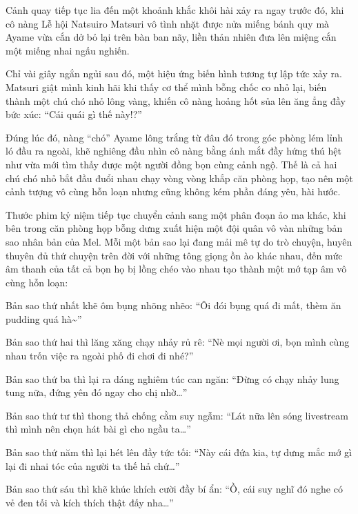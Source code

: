 \documentclass[../main.tex]{subfiles}
\begin{document}

\il

Cảnh quay tiếp tục lia đến một khoảnh khắc khôi hài xảy ra ngay trước đó, khi cô nàng Lễ hội Natsuiro Matsuri vô tình nhặt được nửa miếng bánh quy mà Ayame vừa cắn dở bỏ lại trên bàn ban nãy, liền thản nhiên đưa lên miệng cắn một miếng nhai ngấu nghiến.

Chỉ vài giây ngắn ngủi sau đó, một hiệu ứng biến hình tương tự lập tức xảy ra. Matsuri giật mình kinh hãi khi thấy cơ thể mình bỗng chốc co nhỏ lại, biến thành một chú chó nhỏ lông vàng, khiến cô nàng hoảng hốt sủa lên ăng ẳng đầy bức xúc: ``Cái quái gì thế này!?''

Đúng lúc đó, nàng ``chó'' Ayame lông trắng từ đâu đó trong góc phòng lém lỉnh ló đầu ra ngoài, khẽ nghiêng đầu nhìn cô nàng bằng ánh mắt đầy hứng thú hệt như vừa mới tìm thấy được một người đồng bọn cùng cảnh ngộ. Thế là cả hai chú chó nhỏ bắt đầu đuổi nhau chạy vòng vòng khắp căn phòng họp, tạo nên một cảnh tượng vô cùng hỗn loạn nhưng cũng không kém phần đáng yêu, hài hước.


\il


Thước phim kỷ niệm tiếp tục chuyển cảnh sang một phân đoạn ảo ma khác, khi bên trong căn phòng họp bỗng dưng xuất hiện một đội quân vô vàn những bản sao nhân bản của Mel. Mỗi một bản sao lại đang mải mê tự do trò chuyện, huyên thuyên đủ thứ chuyện trên đời với những tông giọng ồn ào khác nhau, đến mức âm thanh của tất cả bọn họ bị lồng chéo vào nhau tạo thành một mớ tạp âm vô cùng hỗn loạn:

Bản sao thứ nhất khẽ ôm bụng nhõng nhẽo: ``Ôi đói bụng quá đi mất, thèm ăn pudding quá hà\~{}''

Bản sao thứ hai thì lăng xăng chạy nhảy rủ rê: ``Nè mọi người ơi, bọn mình cùng nhau trốn việc ra ngoài phố đi chơi đi nhé?''

Bản sao thứ ba thì lại ra dáng nghiêm túc can ngăn: ``Đừng có chạy nhảy lung tung nữa, đứng yên đó ngay cho chị nhờ\dots''

Bản sao thứ tư thì thong thả chống cằm suy ngẫm: ``Lát nữa lên sóng livestream thì mình nên chọn hát bài gì cho ngầu ta\dots''

Bản sao thứ năm thì lại hét lên đầy tức tối: ``Này cái đứa kia, tự dưng mắc mớ gì lại đi nhai tóc của người ta thế hả chứ\dots''

Bản sao thứ sáu thì khẽ khúc khích cười đầy bí ẩn: ``Ồ, cái suy nghĩ đó nghe có vẻ đen tối và kích thích thật đấy nha\dots''
\end{document}
